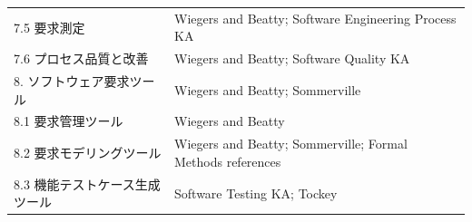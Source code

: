 \begin{longtable}{@{}p{.38\linewidth}p{.55\linewidth}@{}}
7.5 要求測定 & Wiegers and Beatty; Software Engineering Process KA \\
7.6 プロセス品質と改善 & Wiegers and Beatty; Software Quality KA \\
8. ソフトウェア要求ツール & Wiegers and Beatty; Sommerville \\
8.1 要求管理ツール & Wiegers and Beatty \\
8.2 要求モデリングツール & Wiegers and Beatty; Sommerville; Formal Methods references \\
8.3 機能テストケース生成ツール & Software Testing KA; Tockey \\
\bottomrule
\end{longtable}
\normalsize
